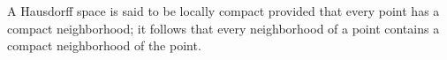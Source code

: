 A Hausdorff space is said to be locally compact provided that every point has a compact neighborhood; it follows that every neighborhood of a point contains a compact neighborhood of the point.
